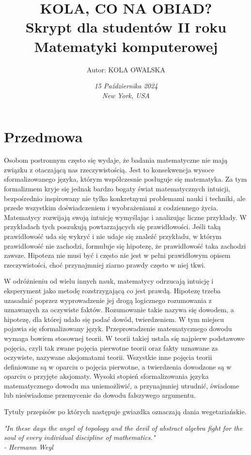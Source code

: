 \documentclass[a4paper,10pt]{book}
\title{\Huge \textbf{KOLA, CO NA OBIAD?}\\
\vspace{0.5cm}
\Large Skrypt dla studentów II roku Matematyki komputerowej}
\author{Autor: KOLA OWALSKA}
\date{\vfill \large \textit{15 Października 2024}\\
\textit{New York, USA}}
\begin{document}
\maketitle
\newpage

\chapter*{Przedmowa} 
\thispagestyle{empty} 

Osobom postronnym często się wydaje, że badania matematyczne nie mają związku z otaczającą nas rzeczywistością. Jest to konsekwencja wysoce sformalizowanego języka, którym współczesnie posługuje się matematyka. Za tym formalizmem kryje się jednak bardzo bogaty świat matematycznych intuicji, bezpośrednio inspirowany nie tylko konkretnymi problemami nauki i techniki, ale przede wszystkim doświadczeniem i wyobrażeniami z codziennego życia. Matematycy rozwijają swoją intuicję wymyślając i analizując liczne przykłady. W przykładach tych poszukują powtarzających się prawidłowości. Jeśli taką prawidłowość uda się wykryć i nie udaje się znaleźć przykładu, w którym prawidłowość nie zachodzi, formułuje się hipotezę, że prawidłowość taka zachodzi zawsze. Hipoteza nie musi być i często nie jest w pełni prawidłowym opisem rzeczywistości, choć przynajmniej ziarno prawdy często w niej tkwi.

W odróżnieniu od wielu innych nauk, matematycy odrzucają intuicję i eksperyment jako metodę rozstrzygającą co jest prawdą. Hipotezę trzeba uzasadnić poprzez wyprowadzenie jej drogą logicznego rozumowania z uznawanych za oczywiste faktów. Rozumowanie takie nazywa się dowodem, a hipotezę, dla której udało się podać dowód, twierdzeniem. W tym miejscu pojawia się sformalizowany język. Przeprowadzenie matematycznego dowodu wymaga bowiem stosownej teorii. W teorii takiej ustala się najpierw podstawowe pojęcia, czyli tak zwane pojęcia pierwotne teorii oraz fakty uznawane za oczywiste, nazywane aksjomatami teorii. Wszystkie inne pojęcia teorii definiowane są w oparciu o pojęcia pierwotne, a twierdzenia dowodzone są w oparciu o przyjęte aksjomaty. Wysoki stopień sformalizowania języka matematycznego dowodu ma uniemożliwić, a przynajmniej utrudnić, świadome lub nieświadome przemycenie do dowodu fałszywego argumentu.

Tytuły przepisów po których następuje gwiazdka oznaczają dania wegetariańskie.

\vspace{1cm} 
\begin{flushright}
    \textit{"In these days the angel of topology and the devil of abstract algebra fight for the soul of every individual discipline of mathematics."} \\
    \textit{- Hermann Weyl}
\end{flushright}
\end{document}
